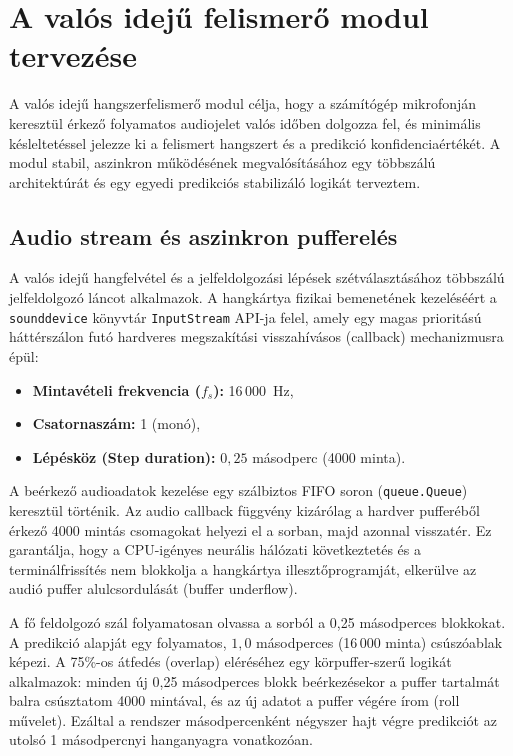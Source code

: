\section{A valós idejű felismerő modul tervezése}
\label{sec:realtime}

A valós idejű hangszerfelismerő modul célja, hogy a számítógép mikrofonján keresztül érkező folyamatos audiojelet valós időben dolgozza fel, és minimális késleltetéssel jelezze ki a felismert hangszert és a predikció konfidenciaértékét. A modul stabil, aszinkron működésének megvalósításához egy többszálú architektúrát és egy egyedi predikciós stabilizáló logikát terveztem.

\subsection{Audio stream és aszinkron pufferelés}

A valós idejű hangfelvétel és a jelfeldolgozási lépések szétválasztásához többszálú jelfeldolgozó láncot alkalmazok. A hangkártya fizikai bemenetének kezeléséért a \texttt{sounddevice} könyvtár \texttt{InputStream} API-ja felel, amely egy magas prioritású háttérszálon futó hardveres megszakítási visszahívásos (callback) mechanizmusra épül:

\begin{itemize}
  \item \textbf{Mintavételi frekvencia ($f_s$):} 16\,000~Hz,
  \item \textbf{Csatornaszám:} 1 (monó),
  \item \textbf{Lépésköz (Step duration):} $0,25$ másodperc (4000 minta).
\end{itemize}

A beérkező audioadatok kezelése egy szálbiztos FIFO soron (\texttt{queue.Queue}) keresztül történik. Az audio callback függvény kizárólag a hardver pufferéből érkező 4000 mintás csomagokat helyezi el a sorban, majd azonnal visszatér. Ez garantálja, hogy a CPU-igényes neurális hálózati következtetés és a terminálfrissítés nem blokkolja a hangkártya illesztőprogramját, elkerülve az audió puffer alulcsordulását (buffer underflow).

A fő feldolgozó szál folyamatosan olvassa a sorból a 0,25 másodperces blokkokat. A predikció alapját egy folyamatos, $1,0$ másodperces (16\,000 minta) csúszóablak képezi. A 75\%-os átfedés (overlap) eléréséhez egy körpuffer-szerű logikát alkalmazok: minden új 0,25 másodperces blokk beérkezésekor a puffer tartalmát balra csúsztatom 4000 mintával, és az új adatot a puffer végére írom (roll művelet). Ezáltal a rendszer másodpercenként négyszer hajt végre predikciót az utolsó 1 másodpercnyi hanganyagra vonatkozóan.

